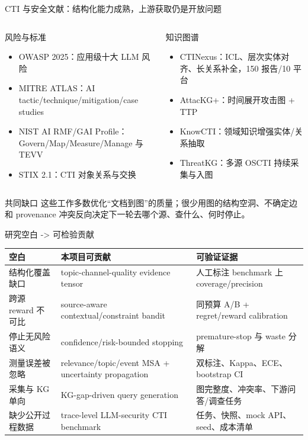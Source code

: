 \begin{frame}{CTI 与安全文献：结构化能力成熟，上游获取仍是开放问题}
\small
\begin{columns}[T,onlytextwidth]
\begin{block}{风险与标准}
\begin{itemize}
  \item OWASP 2025：应用级十大 LLM 风险 \cite{owaspllm2025}
  \item MITRE ATLAS：AI tactic/technique/mitigation/case studies \cite{mitreatlas}
  \item NIST AI RMF/GAI Profile：Govern/Map/Measure/Manage 与 TEVV \cite{nistairmf2023,nistgai2024}
  \item STIX 2.1：CTI 对象关系与交换 \cite{stix21}
\end{itemize}
\end{block}
\begin{block}{知识图谱}
\begin{itemize}
  \item CTINexus：ICL、层次实体对齐、长关系补全，150 报告/10 平台 \cite{cheng2025ctinexus}
  \item AttacKG+：时间展开攻击图 + TTP \cite{zhang2024attackgkplus}
  \item KnowCTI：领域知识增强实体/关系抽取 \cite{knowcti2024}
  \item ThreatKG：多源 OSCTI 持续采集与入图 \cite{threatkg2022}
\end{itemize}
\end{block}
\end{columns}

\begin{alertblock}{共同缺口}
这些工作多数优化“文档到图”的质量；很少用图的结构空洞、不确定边和 provenance 冲突反向决定下一轮去哪个源、查什么、何时停止。
\end{alertblock}
\end{frame}

\begin{frame}{研究空白 -> 可检验贡献}
\scriptsize
\begin{tabularx}{\textwidth}{p{} X X}
\toprule
空白 & 本项目可贡献 & 可验证证据 \\
\midrule
结构化覆盖缺口 & topic-channel-quality evidence tensor & 人工标注 benchmark 上 coverage/precision \\
跨源 reward 不可比 & source-aware contextual/constraint bandit & 同预算 A/B + regret/reward calibration \\
停止无风险语义 & confidence/risk-bounded stopping & premature-stop 与 waste 分解 \\
测量误差被忽略 & relevance/topic/event MSA + uncertainty propagation & 双标注、Kappa、ECE、bootstrap CI \\
采集与 KG 单向 & KG-gap-driven query generation & 图完整度、冲突率、下游问答/调查任务 \\
缺少公开过程数据 & trace-level LLM-security CTI benchmark & 任务、快照、mock API、seed、成本清单 \\
\bottomrule
\end{tabularx}

\end{frame}

